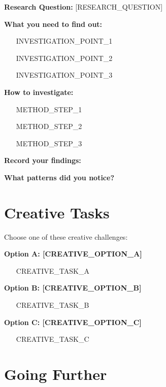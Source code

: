 \documentclass[a4paper,12pt]{article}
\begin{document}
\begin{investigate}
\textbf{Research Question:} [RESEARCH_QUESTION]

\textbf{What you need to find out:}
\begin{itemize}
    \item [INVESTIGATION_POINT_1]
    \item [INVESTIGATION_POINT_2]
    \item [INVESTIGATION_POINT_3]
\end{itemize}

\textbf{How to investigate:}
\begin{enumerate}
    \item [METHOD_STEP_1]
    \item [METHOD_STEP_2]
    \item [METHOD_STEP_3]
\end{enumerate}
\end{investigate}

\textbf{Record your findings:}

\vspace{5cm}

\textbf{What patterns did you notice?}

\vspace{3cm}

\section{Creative Tasks}

\begin{creative}
Choose one of these creative challenges:

\textbf{Option A: [CREATIVE_OPTION_A]}
\begin{itemize}
    \item [CREATIVE_TASK_A]
\end{itemize}

\textbf{Option B: [CREATIVE_OPTION_B]}
\begin{itemize}
    \item [CREATIVE_TASK_B]
\end{itemize}

\textbf{Option C: [CREATIVE_OPTION_C]}
\begin{itemize}
    \item [CREATIVE_TASK_C]
\end{itemize}
\end{creative}

\section{Going Further}
\end{document}
